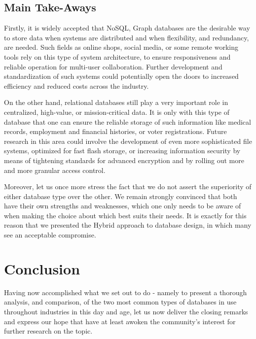 \documentclass[10pt,        %
               a4paper,     %
               journal,     %
               ]{IEEEtran}
\begin{document}
\subsection{Main Take-Aways}
Firstly, it is widely accepted that NoSQL, Graph databases are the desirable way to store data  when systems are distributed and when flexibility, and redundancy, are needed. Such fields as online shops, social media, or some remote working tools rely on this type of system architecture, to ensure responsiveness and reliable operation for multi-user collaboration. Further development and standardization of such systems could potentially open the doors to increased efficiency and reduced costs across the industry. \par
On the other hand, relational databases still play a very important role in centralized, high-value, or mission-critical data. It is only with this type of database that one can ensure the reliable storage of such information like medical records, employment and financial histories, or voter registrations. Future research in this area could involve the development of even more sophisticated file systems, optimized for fast flash storage, or increasing information security by means of tightening standards for advanced encryption and by rolling out more and more granular access control. \par 
Moreover, let us once more stress the fact that we do not assert the superiority of either database type over the other. We remain strongly convinced that both have their own strengths and weaknesses, which one only needs to be aware of when making the choice about which best suits their needs. It is exactly for this reason that we presented the Hybrid approach to database design, in which many see an acceptable compromise. \par

\section{Conclusion}
Having now accomplished what we set out to do - namely to present a thorough analysis, and comparison, of the two most common types of databases in use throughout industries in this day and age, let us now deliver the closing remarks and express our hope that have at least awoken the community's interest for further research on the topic. 

\end{document}
